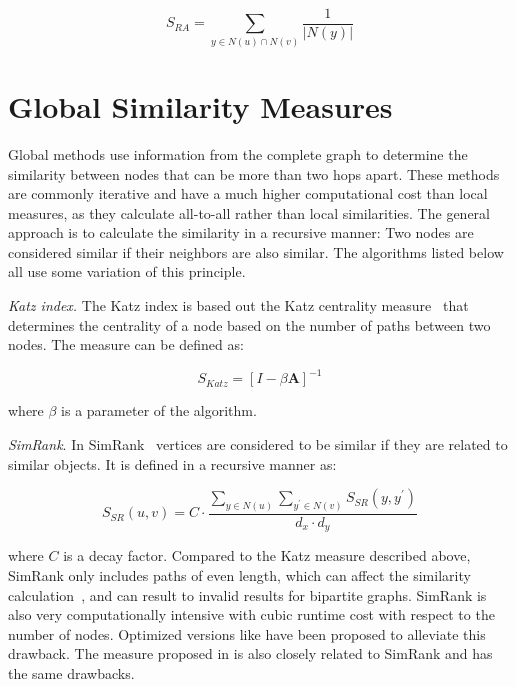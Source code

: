\begin{equation}
S_{RA} = \sum_{y \in N(u) \cap N(v)}{\frac{1}{|N(y)|}}
\end{equation}

\section{Global Similarity Measures}

Global methods use information from the complete graph to determine the
similarity between nodes that can be more than two hops apart. These methods
are commonly iterative and have a much higher computational cost than local
measures, as they calculate all-to-all rather than local similarities.
The general approach is to calculate the similarity in a recursive manner:
Two nodes are considered similar if their neighbors are also similar.
The algorithms listed below all use some variation of this principle.

\emph{Katz index.} The Katz index \cite{vertex-similarity-survey} is based out the Katz centrality
measure~\cite{katz-index} that determines the centrality of a node
based on the number of paths between two nodes. The measure can be
defined as:

\begin{equation}
	S_{Katz} = [I - \beta \mathbf{A}]^{-1}
\end{equation}

\noindent
where $\beta$ is a parameter of the algorithm.

\emph{SimRank}. In SimRank~\cite{simrank} vertices are considered
to be similar if they are related to similar objects. It is defined
in a recursive manner as:

\begin{equation}
	S_{SR}(u, v)= C \cdot \frac{\sum_{y \in N(u)} \sum_{y^{\prime} \in N(v)} S_{SR}(y, y^{\prime})}{d_{x} \cdot d_{y}}
\end{equation}

\noindent
where $C$ is a decay factor. Compared to the Katz measure described above,
SimRank only includes paths of even length, which can affect the similarity
calculation~\cite{vertex-similarity-survey}, and can result to invalid results
for bipartite graphs. SimRank is also very computationally intensive with cubic
runtime cost with respect to the number of nodes. Optimized versions like
\cite{simrankOpt} have been proposed to alleviate this drawback.
The measure proposed in \citet{blondel-similarity} is also closely related to SimRank
and has the same drawbacks.

